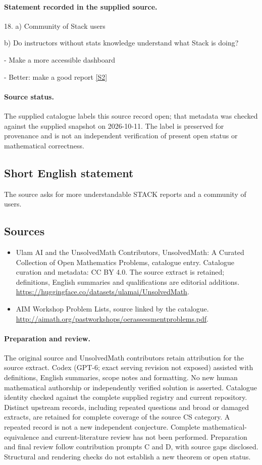 \documentclass[11pt]{article}
\begin{document}
\paragraph{Statement recorded in the supplied source.}
18. a) Community of Stack users

b) Do instructors without stats knowledge understand what Stack is doing?

- Make a more accessible dashboard

- Better: make a good report \href{http://aimath.org/pastworkshops/oerassessmentproblems.pdf}{[S2]}
\paragraph{Source status.}
The supplied catalogue labels this source record open; that metadata was checked against the supplied snapshot on 2026-10-11. The label is preserved for provenance and is not an independent verification of present open status or mathematical correctness.
\subsection{Short English statement}
The source asks for more understandable STACK reports and a community of users.
\subsection{Sources}
\begin{itemize}
\item[S1] Ulam AI and the UnsolvedMath Contributors, UnsolvedMath: A Curated Collection of Open Mathematics Problems, catalogue entry. Catalogue curation and metadata: CC BY 4.0. The source extract is retained; definitions, English summaries and qualifications are editorial additions.
\url{https://huggingface.co/datasets/ulamai/UnsolvedMath}.
\item[S2] AIM Workshop Problem Lists, source linked by the catalogue.
\url{http://aimath.org/pastworkshops/oerassessmentproblems.pdf}.
\end{itemize}
\paragraph{Preparation and review.}
The original source and UnsolvedMath contributors retain attribution for the source extract. Codex (GPT-6; exact serving revision not exposed) assisted with definitions, English summaries, scope notes and formatting. No new human mathematical authorship or independently verified solution is asserted. Catalogue identity checked against the complete supplied registry and current repository. Distinct upstream records, including repeated questions and broad or damaged extracts, are retained for complete coverage of the source CS category. A repeated record is not a new independent conjecture. Complete mathematical-equivalence and current-literature review has not been performed. Preparation and final review follow contribution prompts C and D, with source gaps disclosed. Structural and rendering checks do not establish a new theorem or open status.
\label{end:statement}
\end{document}
